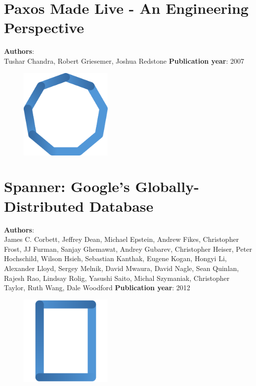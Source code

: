 \documentclass[11pt,fleqn]{book} %
\begin{document}
\chapter{Paxos Made Live - An Engineering Perspective}
\vspace*{-7mm}
\Large \textbf{Authors}: \\
Tushar Chandra, Robert Griesemer, Joshua Redstone
\newline\newline
\textbf{Publication year}: 2007
\begin{figure}[b]
    \centering
    \includegraphics[width=0.4\textwidth]{distributed-systems-blue.pdf}
\end{figure}


\chapter{Spanner: Google’s Globally-Distributed Database}
\vspace*{-7mm}
\Large \textbf{Authors}: \\
James C. Corbett, Jeffrey Dean, Michael Epstein, Andrew Fikes, Christopher Frost, JJ Furman, Sanjay Ghemawat, Andrey Gubarev, Christopher Heiser, Peter Hochschild, Wilson Hsieh, Sebastian Kanthak, Eugene Kogan, Hongyi Li, Alexander Lloyd, Sergey Melnik, David Mwaura, David Nagle, Sean Quinlan, Rajesh Rao, Lindsay Rolig, Yasushi Saito, Michal Szymaniak, Christopher Taylor, Ruth Wang, Dale Woodford
\newline\newline
\textbf{Publication year}: 2012
\begin{figure}[b]
    \centering
    \includegraphics[width=0.4\textwidth]{distributed-systems-rectangle-blue.pdf}
\end{figure}

\end{document}
